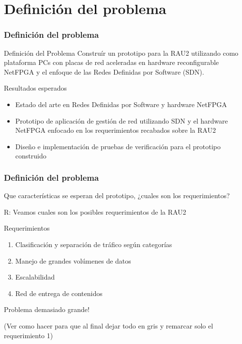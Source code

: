 \documentclass{beamer}
\begin{document}
\section{Definición del problema} 
\frame{\tableofcontents[currentsection]}

\begin{frame}
\frametitle{Definición del problema} 

\begin{block}{Definición del Problema }
Constru\'ir un prototipo para la RAU2 utilizando como plataforma PCs con placas de red aceleradas en hardware reconfigurable NetFPGA y el enfoque de las Redes Definidas por Software (SDN).
\end{block}

\pause
\begin{block}{Resultados esperados}
\begin{itemize}
\item Estado del arte en Redes Definidas por Software y hardware NetFPGA
\pause
\item Prototipo de aplicaci\'on de gesti\'on de red utilizando SDN y el hardware NetFPGA enfocado en los requerimientos recabados sobre la RAU2
\pause
\item Diseño e implementaci\'on de pruebas de verificaci\'on para el prototipo construido
\end{itemize}
\end{block}

\end{frame}

\begin{frame}
\frametitle{Definición del problema} 

Que características se esperan del prototipo, ¿cuales son los requerimientos?

\pause
{\color{blue}R: Veamos cuales son los posibles requerimientos de la RAU2}

\pause
\begin{block}{Requerimientos}
\begin{enumerate}[<+->]
\item Clasificaci\'on y separaci\'on de tr\'afico seg\'un categorías
\item Manejo de grandes vol\'umenes de datos
\item Escalabilidad
\item Red de entrega de contenidos
\end{enumerate}
\end{block}

\pause
Problema demasiado grande!

(Ver como hacer para que al final dejar todo en gris y remarcar solo el requerimiento 1)
\end{frame}
\end{document}
